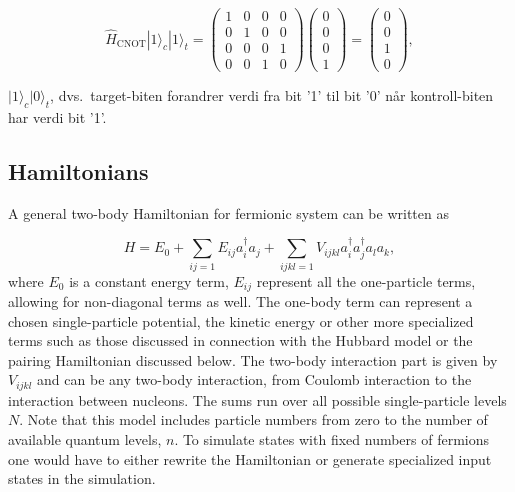 \documentclass[%
oneside,                 %
final,                   %
10pt]{article}
\begin{document}
\begin{equation}
   \hat{H}_{\mathrm{CNOT}}|1\rangle_c|1\rangle_t=
    \left(\begin{array}{cccc} 1 & 0 & 0 &0  \\ 
                              0 & 1 & 0 &0  \\
                              0& 0 & 0 &1  \\
                              0 & 0 & 1 &0\end{array}\right)
                              \left(\begin{array}{c} 0  \\ 
                                                 0  \\
                                                 0  \\
                                                 1  \end{array}\right)=
\left(\begin{array}{c} 0  \\ 
                                                 0  \\
                                                 1  \\
                                                 0  \end{array}\right),
\end{equation}

$|1\rangle_c\vert 0 \rangle_t$, dvs.~target-biten forandrer verdi fra bit '1'
til bit '0' når kontroll-biten har verdi bit '1'.

\subsection{Hamiltonians}

A general two-body Hamiltonian for fermionic system 
can be written as

\begin{equation}
\label{eq:twobodyH}
H = E_0 + \sum_{ij=1} E_{ij} a^\dag_i a_j
+\sum_{ijkl = 1} V_{ijkl} a^\dag_i a^\dag_j a_l a_k,
\end{equation}
where $E_0$ is a constant energy term, $E_{ij}$ represent all the
one-particle terms, allowing for non-diagonal terms as well. The
one-body term can represent 
a chosen single-particle potential, the kinetic energy or other more
specialized terms such as  
those discussed in connection with the Hubbard model or the pairing Hamiltonian  
discussed below.
The two-body interaction part is given by $V_{ijkl}$ and can be any
two-body interaction, from 
Coulomb interaction to the interaction between nucleons.  
The sums run over all possible single-particle levels $N$. 
Note that
this model includes particle numbers from zero to the number of
available quantum levels, $n$. To simulate states with fixed numbers
of fermions one would have to either rewrite the Hamiltonian or
generate specialized input states in the simulation.
\end{document}
